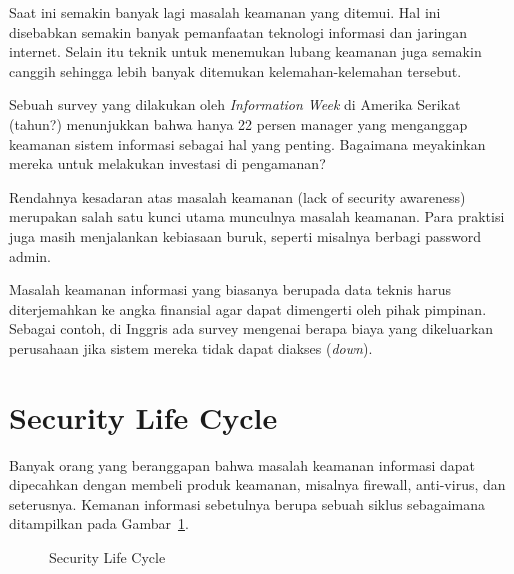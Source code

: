 Saat ini semakin banyak lagi masalah keamanan yang ditemui.
Hal ini disebabkan semakin banyak pemanfaatan teknologi informasi dan
jaringan internet.
Selain itu teknik untuk menemukan lubang keamanan juga semakin
canggih sehingga lebih banyak ditemukan kelemahan-kelemahan tersebut.

Sebuah survey yang dilakukan oleh {\em Information Week} di Amerika
Serikat (tahun?) menunjukkan bahwa hanya 22 persen manager yang
menganggap keamanan sistem informasi sebagai hal yang penting.
Bagaimana meyakinkan mereka untuk melakukan investasi di pengamanan?

Rendahnya kesadaran atas masalah keamanan (lack of security awareness)
merupakan salah satu kunci utama munculnya masalah keamanan.
Para praktisi juga masih menjalankan kebiasaan buruk,
seperti misalnya berbagi password admin.

Masalah keamanan informasi yang biasanya berupada data teknis
harus diterjemahkan ke angka finansial agar dapat dimengerti 
oleh pihak pimpinan.
Sebagai contoh, di Inggris ada survey mengenai berapa biaya
yang dikeluarkan perusahaan jika sistem mereka tidak dapat
diakses ({\em down}).



\section{Security Life Cycle}
Banyak orang yang beranggapan bahwa masalah keamanan informasi
dapat dipecahkan dengan membeli produk keamanan,
misalnya firewall, anti-virus, dan seterusnya.
Kemanan informasi sebetulnya berupa sebuah siklus
sebagaimana ditampilkan pada Gambar~\ref{fig:security-life-cycle}.

\begin{figure}[ht]
\caption{Security Life Cycle}
\label{fig:security-life-cycle}
\end{figure}

